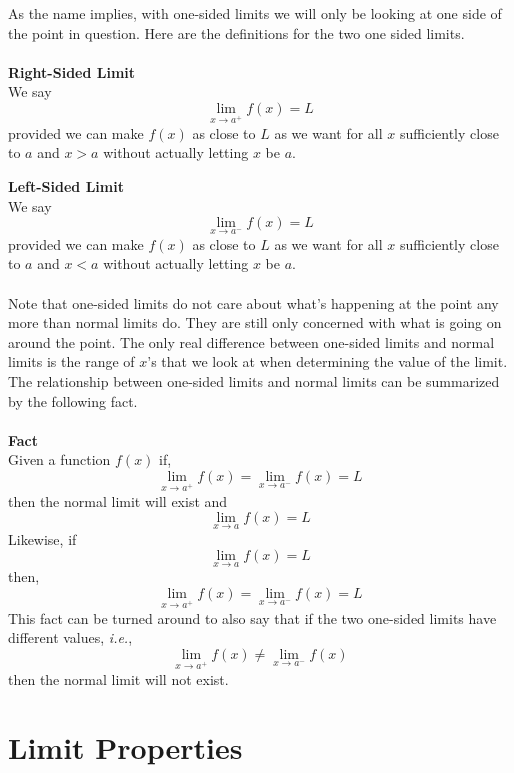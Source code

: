 \documentclass[10pt,reqno]{book}
\begin{document}
	As the name implies, with one-sided limits we will only be looking at one side of the point in question. Here are the definitions for the two one sided limits.\\ \\
	\textbf{Right-Sided Limit}\\
	We say
	\[ \lim\limits_{x\to a^+} f(x) = L \]
	provided we can make $ f(x) $ as close to $ L $ as we want for all $ x $ sufficiently close to $ a $ and $ x>a $ without actually letting $ x $ be $ a $.

	\noindent \textbf{Left-Sided Limit}\\
	We say
	\[ \lim\limits_{x\to a^-} f(x) = L \]
	provided we can make $ f(x) $ as close to $ L $ as we want for all $ x $ sufficiently close to $ a $ and $ x<a $ without actually letting $ x $ be $ a $.	\\ \\
	Note that one-sided limits do not care about what's happening at the point any more than normal limits do. They are still only concerned with what is going on around the point. The only real difference between one-sided limits and normal limits is the range of $ x $'s that we look at when determining the value of the limit. The relationship between one-sided limits and normal limits can be summarized by the following fact.\\ \\
	\textbf{Fact}\\
	Given a function $ f(x) $ if,
	\[ \lim\limits_{x\to a^+} f(x) = \lim\limits_{x\to a^-} f(x) = L \]
	then the normal limit will exist and 
	\[ \lim\limits_{x\to a} f(x) = L \]
	Likewise, if
	\[ \lim\limits_{x\to a} f(x) = L \]
	then,
	\[ \lim\limits_{x\to a^+} f(x) = \lim\limits_{x\to a^-} f(x) = L \]
	This fact can be turned around to also say that if the two one-sided limits have different values, \textit{i.e.},
	\[ \lim\limits_{x\to a^+} f(x) \neq \lim\limits_{x\to a^-} f(x) \]
	then the normal limit will not exist.
	
	
	\section{Limit Properties}
	
\end{document}
